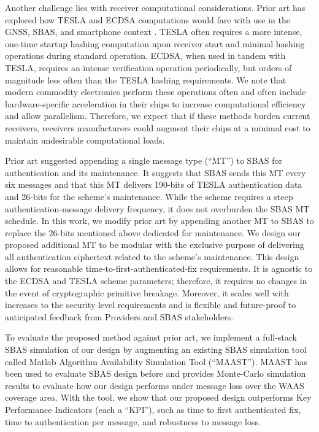\documentclass[letterpaper,times]{IONconf/IONconf}
\begin{document}
Another challenge lies with receiver computational considerations.
Prior art has explored how TESLA and ECDSA computations would fare with use in the GNSS, SBAS, and smartphone context \cite{tesla-cpus}.
TESLA often requires a more intense, one-time startup hashing computation upon receiver start and minimal hashing operations during standard operation.
ECDSA, when used in tandem with TESLA, requires an intense verification operation periodically, but orders of magnitude less often than the TESLA hashing requirements.
We note that modern commodity electronics perform these operations often and often include hardware-specific acceleration in their chips to increase computational efficiency and allow parallelism.
Therefore, we expect that if these methods burden current receivers, receivers manufacturers could augment their chips at a minimal cost to maintain undesirable computational loads.

Prior art suggested appending a single message type (``MT'') to SBAS for authentication and its maintenance\cite{Neish_Dissertation}.
It suggests that SBAS sends this MT every six messages and that this MT delivers 190-bits of TESLA authentication data and 26-bits for the scheme's maintenance.
While the scheme requires a steep authentication-message delivery frequency, it does not overburden the SBAS MT schedule.
In this work, we modify prior art by appending another MT to SBAS to replace the 26-bits mentioned above dedicated for maintenance.
We design our proposed additional MT to be modular with the exclusive purpose of delivering all authentication ciphertext related to the scheme's maintenance.
This design allows for reasonable time-to-first-authenticated-fix requirements.
It is agnostic to the ECDSA and TESLA scheme parameters; therefore, it requires no changes in the event of cryptographic primitive breakage.
Moreover, it scales well with increases to the security level requirements and is flexible and future-proof to anticipated feedback from Providers and SBAS stakeholders.

To evaluate the proposed method against prior art, we implement a full-stack SBAS simulation of our design by augmenting an existing SBAS simulation tool called Matlab Algorithm Availability Simulation Tool (``MAAST'')\cite{MAAST}.
MAAST has been used to evaluate SBAS design before and provides Monte-Carlo simulation results to evaluate how our design performs under message loss over the WAAS coverage area.
With the tool, we show that our proposed design outperforms Key Performance Indicators (each a ``KPI''), such as time to first authenticated fix, time to authentication per message, and robustness to message loss.
\end{document}
